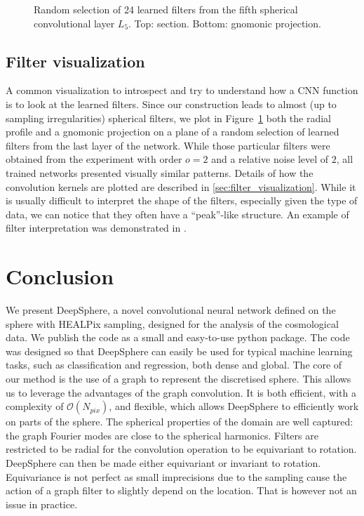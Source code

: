 \documentclass[final,twocolumn,3p,times,sort&compress]{elsarticle}
\newcommand{\figref}[1]{Figure~\ref{fig:#1}}
\newcommand{\1}{\b{1}}              %
\newcommand{\0}{\b{0}}              %
\newcommand{\bO}{\mathcal{O}}
\begin{document}
\begin{figure}
	\caption{Random selection of 24 learned filters from the fifth spherical convolutional layer $L_5$. Top: section. Bottom: gnomonic projection.}
	\label{fig:learned_filter}
\end{figure}

\subsection{Filter visualization}


A common visualization to introspect and try to understand how a CNN function is to look at the learned filters.
Since our construction leads to almost (up to sampling irregularities) spherical filters, we plot in \figref{learned_filter} both the radial profile and a gnomonic projection on a plane of a random selection of learned filters from the last layer of the network.
While those particular filters were obtained from the experiment with order $o=2$ and a relative noise level of $2$, all trained networks presented visually similar patterns.
Details of how the convolution kernels are plotted are described in \ref{sec:filter_visualization}.
While it is usually difficult to interpret the shape of the filters, especially given the type of data, we can notice that they often have a ``peak''-like structure.
An example of filter interpretation was demonstrated in \citep{Ribli2018learningfrom}.

\section{Conclusion}
\label{sec:conclusion}

We present DeepSphere, a novel convolutional neural network defined on the sphere with HEALPix sampling, designed for the analysis of the cosmological data.
We publish the code as a small and easy-to-use python package.
The code was designed so that DeepSphere can easily be used for typical machine learning tasks, such as classification and regression, both dense and global.
The core of our method is the use of a graph to represent the discretised sphere.
This allows us to leverage the advantages of the graph convolution.
It is both efficient, with a complexity of $\bO(N_{pix})$, and flexible, which allows DeepSphere to efficiently work on parts of the sphere.
The spherical properties of the domain are well captured: the graph Fourier modes are close to the spherical harmonics.
Filters are restricted to be radial for the convolution operation to be equivariant to rotation.
DeepSphere can then be made either equivariant or invariant to rotation.
Equivariance is not perfect as small imprecisions due to the sampling cause the action of a graph filter to slightly depend on the location.
That is however not an issue in practice.
\end{document}
